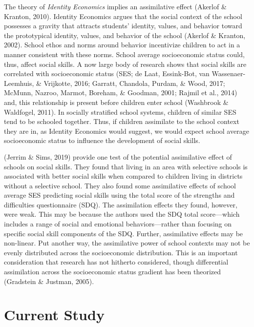 \documentclass[
  english,
  man]{apa6}
\begin{document}
The theory of \emph{Identity Economics} implies an assimilative effect (Akerlof \& Kranton, 2010). Identity Economics argues that the social context of the school possesses a gravity that attracts students' identity, values, and behavior toward the prototypical identity, values, and behavior of the school (Akerlof \& Kranton, 2002). School ethos and norms around behavior incentivize children to act in a manner consistent with these norms. School average socioeconomic status could, thus, affect social skills. A now large body of research shows that social skills are correlated with socioeconomic status (SES; de Laat, Essink-Bot, van Wassenaer-Leemhuis, \& Vrijkotte, 2016; Garratt, Chandola, Purdam, \& Wood, 2017; McMunn, Nazroo, Marmot, Boreham, \& Goodman, 2001; Rajmil et al., 2014) and, this relationship is present before children enter school (Washbrook \& Waldfogel, 2011). In socially stratified school systems, children of similar SES tend to be schooled together. Thus, if children assimilate to the school context they are in, as Identity Economics would suggest, we would expect school average socioeconomic status to influence the development of social skills.

(Jerrim \& Sims, 2019) provide one test of the potential assimilative effect of schools on social skills. They found that living in an area with selective schools is associated with better social skills when compared to children living in districts without a selective school. They also found some assimilative effects of school average SES predicting social skills using the total score of the strengths and difficulties questionnaire (SDQ). The assimilation effects they found, however, were weak. This may be because the authors used the SDQ total score---which includes a range of social and emotional behaviors---rather than focusing on specific social skill components of the SDQ. Further, assimilative effects may be non-linear. Put another way, the assimilative power of school contexts may not be evenly distributed across the socioeconomic distribution. This is an important consideration that research has not hitherto considered, though differential assimilation across the socioeconomic status gradient has been theorized (Gradstein \& Justman, 2005).

\hypertarget{current-study}{%
\section{Current Study}\label{current-study}}
\end{document}
